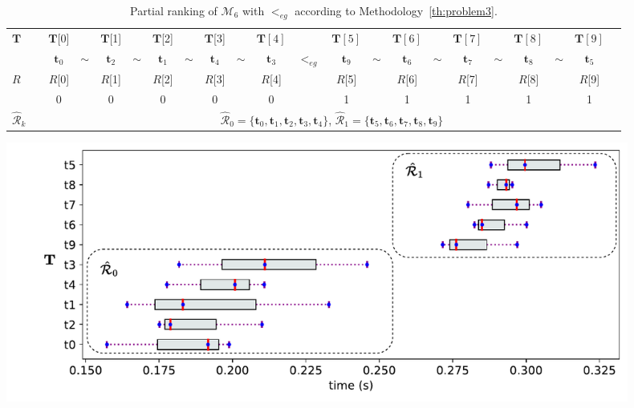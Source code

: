 \documentclass[acmsmall,screen, review]{acmart}
\begin{document}
\begin{table}[h!]
	\centering
	\begin{minipage}{\columnwidth}
		\centering
		\begin{adjustbox}{width=.9\columnwidth,center}
			\begin{tabular}{@{}ll cc cc cc cc cc cc cc cc cc cc@{}}
				\toprule
				$\mathbf{T}$&& $\mathbf{T}$[0] &&$\mathbf{T}$[1] && $\mathbf{T}$[2] && $\mathbf{T}$[3]&&$\mathbf{T}[4]$&&$\mathbf{T}[5]$&&$\mathbf{T}[6]$&&$\mathbf{T}[7]$&&$\mathbf{T}[8]$&&$\mathbf{T}[9]$&\\
				\cmidrule{3-22}
				&& $\mathbf{t}_0$ &$\sim$&  $\mathbf{t}_2$&$\sim$&  $\mathbf{t}_1$ &$\sim$ &  $\mathbf{t}_4$&$\sim$&$\mathbf{t}_3$&$<_{eg}$&$\mathbf{t}_9$&$\sim$&$\mathbf{t}_6$&$\sim$&$\mathbf{t}_7$&$\sim$&$\mathbf{t}_8$&$\sim$&$\mathbf{t}_5$& \\
				\midrule
				$R$ &&$R$[0] &&$R$[1] && $R$[2] && $R$[3]&&$R$[4]&&$R$[5]&&$R$[6]&&$R$[7]&&$R$[8]&&$R$[9]&\\
				\cmidrule{3-22}
				&& 0 &&  0 &&  0 &&   0&&0&&1&&1&&1&&1&&1& \\
				\midrule
				$\mathcal{\hat{R}}_k$&&\multicolumn{20}{c}{$\mathcal{\hat{R}}_0 = \{ \mathbf{t}_0, \mathbf{t}_1, \mathbf{t}_2, \mathbf{t}_3, \mathbf{t}_4\}$, $\mathcal{\hat{R}}_1 = \{\mathbf{t}_5, \mathbf{t}_6, \mathbf{t}_7, \mathbf{t}_8, \mathbf{t}_9\}$}\\
				\bottomrule
			\end{tabular}
		\end{adjustbox}
		\caption{Partial ranking of $\mathcal{M}_6$ with $<_{eg}$ according to Methodology~\ref{th:problem3}.}
		\label{tab3:min-ranks-eg1}
	\end{minipage}
	\bigskip
	
	\begin{minipage}{.9\linewidth}
		\centering
		\includegraphics[width=0.9\textwidth]{fig/ch3/hasse-eg2-r}
		\label{fig3:hasse-eg2-r}
	\end{minipage}
\end{table}
\end{document}
